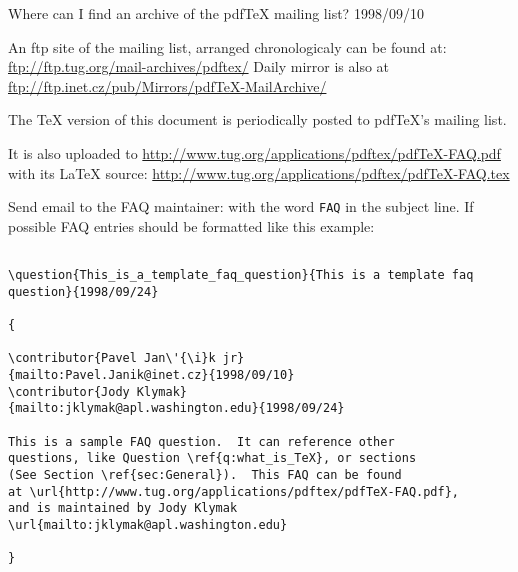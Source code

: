 \documentclass[11pt]{article}
\begin{document}
 {
  Where can I find an archive of the pdfTeX mailing list?  }{1998/09/10}

{ 

An ftp site of the mailing list, arranged chronologicaly can be
  found at: \url{ftp://ftp.tug.org/mail-archives/pdftex/} Daily mirror
  is also at \url{ftp://ftp.inet.cz/pub/Mirrors/pdfTeX-MailArchive/} }


{ 

  The TeX version of this document is periodically posted to pdfTeX's
  mailing list.

  It is also uploaded to
  \url{http://www.tug.org/applications/pdftex/pdfTeX-FAQ.pdf}
  with its LaTeX source:
  \url{http://www.tug.org/applications/pdftex/pdfTeX-FAQ.tex} }



{

Send email to the FAQ maintainer: \maintainer with the word
\texttt{FAQ} in the subject line.  If possible FAQ entries should be
formatted like this example:

\begin{verbatim}

\question{This_is_a_template_faq_question}{This is a template faq question}{1998/09/24}

{

\contributor{Pavel Jan\'{\i}k jr}
{mailto:Pavel.Janik@inet.cz}{1998/09/10}
\contributor{Jody Klymak}
{mailto:jklymak@apl.washington.edu}{1998/09/24}

This is a sample FAQ question.  It can reference other
questions, like Question \ref{q:what_is_TeX}, or sections
(See Section \ref{sec:General}).  This FAQ can be found
at \url{http://www.tug.org/applications/pdftex/pdfTeX-FAQ.pdf},
and is maintained by Jody Klymak
\url{mailto:jklymak@apl.washington.edu}

}

\end{verbatim}

}


\end{document}
